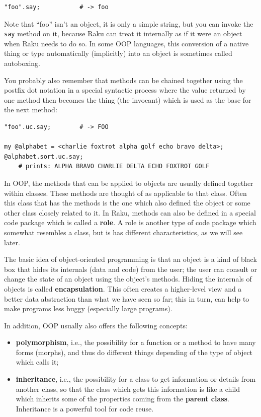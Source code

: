 \begin{verbatim}
"foo".say;           # -> foo
\end{verbatim}

Note that ``foo'' isn't an object, it is only a simple string, but 
you can invoke the \verb'say' method on it, because Raku 
can treat it internally as if it were an object when Raku needs to do so. In some 
OOP languages, this conversion of a native thing or type automatically (implicitly)
into an object is sometimes called autoboxing.

You probably also remember that methods can be chained together using the postfix dot notation in a 
special syntactic process where the value returned by one method then becomes the thing (the invocant)
which is used as the base for the next method:

\begin{verbatim}
"foo".uc.say;        # -> FOO

my @alphabet = <charlie foxtrot alpha golf echo bravo delta>;
@alphabet.sort.uc.say;
    # prints: ALPHA BRAVO CHARLIE DELTA ECHO FOXTROT GOLF 
\end{verbatim}

In OOP, the methods that can be applied to objects are usually defined together
within classes. These methods are thought of as applicable to that class. Often this class that 
has the methods is the one which also defined the 
object or some other class closely related to it. In Raku, 
methods can also be defined in a special code package which is called a {\bf role}. 
A role is another type of code package which somewhat resembles a class, but is has different 
characteristics, as we will see later.

The basic idea of object-oriented programming is that an 
object is a kind of black box that hides its internals
(data and code) from the user; the user can consult or change 
the state of an object using the object's methods. Hiding the 
internals of objects is called {\bf encapsulation}. This 
often creates a higher-level view and a better data 
abstraction than what we have seen so far; this in turn, can
help to make programs less buggy (especially large programs).

In addition, OOP usually also offers the following concepts:
\begin{itemize}
\item {\bf polymorphism}, i.e., the possibility for a function or 
a method to have many forms (morphs), and thus do different things depending of the type of 
object which calls it;
\item {\bf inheritance}, i.e., the possibility for a class to get information or details from 
another class, so that the class which gets this information is like a child which inherits some of 
the properties coming from the {\bf parent class}. Inheritance is a powerful tool for code reuse.
\end{itemize}

